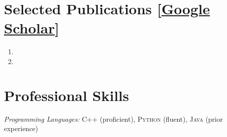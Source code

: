 \documentclass[line,11pt,letter]{/Users/longgong/Dropbox/git-reps/easy_cv/includes/cls/myRes}
\begin{document}
\begin{resume}
\section{Selected Publications [\href{https://scholar.google.com/citations?user=qtAikfAAAAAJ&hl=en}{Google Scholar}]}
\vspace{-4pt}
\vspace*{2pt}
\begin{enumerate}[
  label=\arabic*. ,
  labelwidth=\widthof{1. },
  leftmargin=\widthof{1.\enspace}
  ] \itemsep -2pt %
    \item {}
    \item {}
  \end{enumerate}
\vspace*{2pt}\negspace
\section{Professional Skills}
\vspace{-4pt}
\setlength{\parskip}{0pt}
{\sl Programming Languages:} \textsc{C++} (proficient), \textsc{Python} (fluent), \textsc{Java} (prior experience)\\
\vspace*{4pt}
\negspace

\end{resume}
\end{document}
